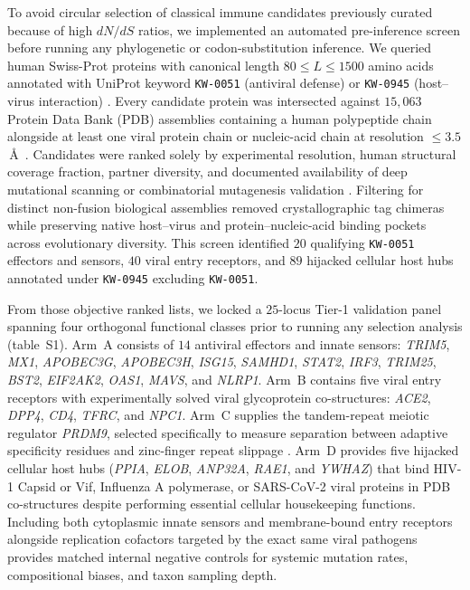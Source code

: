 \documentclass[12pt]{article}
\begin{document}
To avoid circular selection of classical immune candidates previously curated because of high $dN/dS$ ratios, we implemented an automated pre-inference screen before running any phylogenetic or codon-substitution inference. We queried human Swiss-Prot proteins with canonical length $80 \le L \le 1500$ amino acids annotated with UniProt keyword \texttt{KW-0051} (antiviral defense) or \texttt{KW-0945} (host--virus interaction) \cite{uniprot2023uniprot}. Every candidate protein was intersected against $15,063$ Protein Data Bank (PDB) assemblies containing a human polypeptide chain alongside at least one viral protein chain or nucleic-acid chain at resolution $\le 3.5$\,\AA\ \cite{berman2000protein}. Candidates were ranked solely by experimental resolution, human structural coverage fraction, partner diversity, and documented availability of deep mutational scanning or combinatorial mutagenesis validation \cite{sawyer2004ancient,patel2012antagonism,ng2015filovirus,abraham2010structure,kwong1998structure,lu2013molecular}. Filtering for distinct non-fusion biological assemblies removed crystallographic tag chimeras while preserving native host--virus and protein--nucleic-acid binding pockets across evolutionary diversity. This screen identified $20$ qualifying \texttt{KW-0051} effectors and sensors, $40$ viral entry receptors, and $89$ hijacked cellular host hubs annotated under \texttt{KW-0945} excluding \texttt{KW-0051}.

From those objective ranked lists, we locked a $25$-locus Tier-1 validation panel spanning four orthogonal functional classes prior to running any selection analysis (table~S1). Arm~A consists of $14$ antiviral effectors and innate sensors: \textit{TRIM5}, \textit{MX1}, \textit{APOBEC3G}, \textit{APOBEC3H}, \textit{ISG15}, \textit{SAMHD1}, \textit{STAT2}, \textit{IRF3}, \textit{TRIM25}, \textit{BST2}, \textit{EIF2AK2}, \textit{OAS1}, \textit{MAVS}, and \textit{NLRP1}. Arm~B contains five viral entry receptors with experimentally solved viral glycoprotein co-structures: \textit{ACE2}, \textit{DPP4}, \textit{CD4}, \textit{TFRC}, and \textit{NPC1}. Arm~C supplies the tandem-repeat meiotic regulator \textit{PRDM9}, selected specifically to measure separation between adaptive specificity residues and zinc-finger repeat slippage \cite{patel2016prdm9}. Arm~D provides five hijacked cellular host hubs (\textit{PPIA}, \textit{ELOB}, \textit{ANP32A}, \textit{RAE1}, and \textit{YWHAZ}) that bind HIV-1 Capsid or Vif, Influenza A polymerase, or SARS-CoV-2 viral proteins in PDB co-structures despite performing essential cellular housekeeping functions. Including both cytoplasmic innate sensors and membrane-bound entry receptors alongside replication cofactors targeted by the exact same viral pathogens provides matched internal negative controls for systemic mutation rates, compositional biases, and taxon sampling depth.
\end{document}
